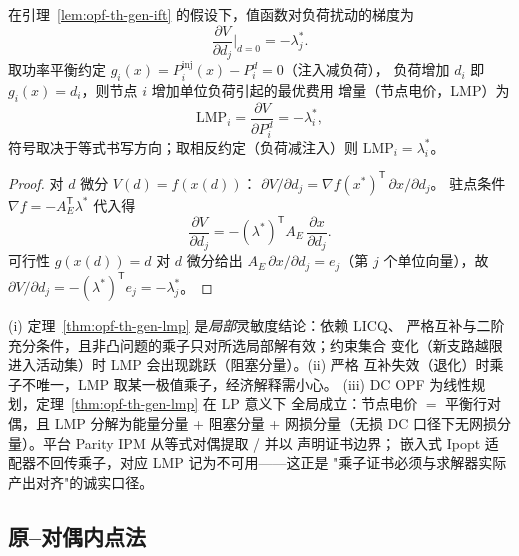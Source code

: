 \begin{theorem}[功率平衡乘子等于节点电价]\label{thm:opf-th-gen-lmp}
在引理~\ref{lem:opf-th-gen-ift} 的假设下，值函数对负荷扰动的梯度为
\begin{equation}
\frac{\partial V}{\partial d_j}\Big|_{d=0}=-\lambda_j^*.
\label{eq:opf-th-gen-shadow}
\end{equation}
取功率平衡约定 $g_i(x)=P_i^{\mathrm{inj}}(x)-P_i^d=0$（注入减负荷），
负荷增加 $d_i$ 即 $g_i(x)=d_i$，则节点 $i$ 增加单位负荷引起的最优费用
增量（节点电价，LMP\cite{opft:schweppe-spot}）为
\begin{equation}
\mathrm{LMP}_i=\frac{\partial V}{\partial P_i^d}=-\lambda_i^*,
\label{eq:opf-th-gen-lmp}
\end{equation}
符号取决于等式书写方向；取相反约定（负荷减注入）则 $\mathrm{LMP}_i=
\lambda_i^*$。
\end{theorem}

\begin{proof}
对 $d$ 微分 $V(d)=f(x(d))$：
$\partial V/\partial d_j=\nabla f(x^*)^{\mathsf T}\,\partial x/\partial d_j$。
驻点条件 $\nabla f=-A_E^{\mathsf T}\lambda^*$ 代入得
\begin{equation}
\frac{\partial V}{\partial d_j}
=-(\lambda^*)^{\mathsf T}A_E\,\frac{\partial x}{\partial d_j}.
\end{equation}
可行性 $g(x(d))=d$ 对 $d$ 微分给出
$A_E\,\partial x/\partial d_j=e_j$（第 $j$ 个单位向量），故
$\partial V/\partial d_j=-(\lambda^*)^{\mathsf T}e_j=-\lambda_j^*$。
\end{proof}

\begin{remark}[解释与适用边界]\label{rem:opf-th-gen-lmp-scope}
(i) 定理~\ref{thm:opf-th-gen-lmp} 是\emph{局部}灵敏度结论：依赖 LICQ、
严格互补与二阶充分条件，且非凸问题的乘子只对所选局部解有效；约束集合
变化（新支路越限进入活动集）时 LMP 会出现跳跃（阻塞分量）。(ii) 严格
互补失效（退化）时乘子不唯一，LMP 取某一极值乘子，经济解释需小心。
(iii) DC OPF 为线性规划，定理~\ref{thm:opf-th-gen-lmp} 在 LP 意义下
全局成立：节点电价 $=$ 平衡行对偶，且 LMP 分解为能量分量 + 阻塞分量 +
网损分量（无损 DC 口径下无网损分量）。平台 Parity IPM 从等式对偶提取
/ 并以  声明证书边界；
嵌入式 Ipopt 适配器不回传乘子，对应 LMP 记为不可用——这正是
"乘子证书必须与求解器实际产出对齐"的诚实口径。
\end{remark}

\subsection{原--对偶内点法}\label{sec:opf-th-gen-ipm}

